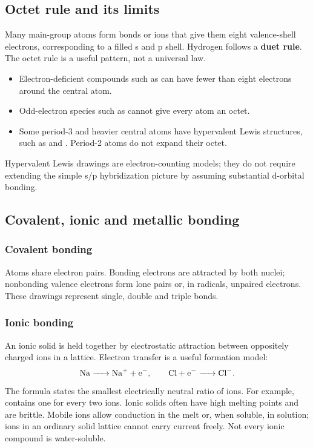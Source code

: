 \documentclass[a4paper,10pt]{article}
\begin{document}
\subsection{Octet rule and its limits}
Many main-group atoms form bonds or ions that give them eight valence-shell
electrons, corresponding to a filled s and p shell. Hydrogen follows a
\textbf{duet rule}. The octet rule is a useful pattern, not a universal law.
\begin{itemize}
  \item Electron-deficient compounds such as  can have fewer than eight
  electrons around the central atom.
  \item Odd-electron species such as  cannot give every atom an octet.
  \item Some period-3 and heavier central atoms have hypervalent Lewis structures,
  such as  and . Period-2 atoms do not expand their octet.
\end{itemize}
Hypervalent Lewis drawings are electron-counting models; they do not require
extending the simple s/p hybridization picture by assuming substantial d-orbital bonding.

\subsection{Covalent, ionic and metallic bonding}
\subsubsection{Covalent bonding}
Atoms share electron pairs. Bonding electrons are attracted by both nuclei;
nonbonding valence electrons form lone pairs or, in radicals, unpaired electrons.
These drawings represent single, double and triple bonds.

\subsubsection{Ionic bonding}
An ionic solid is held together by electrostatic attraction between oppositely
charged ions in a lattice. Electron transfer is a useful formation model:
\[
 \ce{Na -> Na+ + e-},\qquad \ce{Cl + e- -> Cl-}.
\]
The formula states the smallest electrically neutral ratio of ions. For example,
 contains one  for every two  ions.
Ionic solids often have high melting points and are brittle. Mobile ions allow
conduction in the melt or, when soluble, in solution; ions in an ordinary solid
lattice cannot carry current freely. Not every ionic compound is water-soluble.
\end{document}
